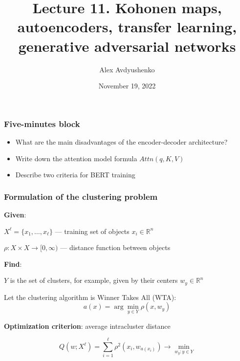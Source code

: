 \documentclass[fullscreen=true, bookmarks=true, hyperref={pdfencoding=unicode}]{beamer}
\title{Lecture 11. Kohonen maps, autoencoders, transfer learning, generative adversarial networks}
\author{Alex Avdyushenko}
\institute{Kazakh-British Technical University}
\date{November 19, 2022}
\begin{document}

\begin{frame}
\transdissolve[duration=0.2]
\titlepage
\end{frame}


\begin{frame}
  \frametitle{Five-minutes block}
  \pause
  \begin{itemize}
    \item What are the main disadvantages of the encoder-decoder architecture?
    \item Write down the attention model formula $Attn(q, K, V)$
    \item Describe two criteria for BERT training
  \end{itemize}
\end{frame}


\begin{frame}
  \frametitle{Formulation of the clustering problem}

   {\bf Given}:

    $X^\ell = \{x_1, \dots, x_\ell \}$ — training set of objects $x_i \in \mathbb{R}^n$

    $\rho: X \times X \to [0, \infty)$ — distance function between objects

   \pause
   {\bf Find}:

   $Y$ is the set of clusters, for example, given by their centers $w_y \in \mathbb{R}^n$

   Let the clustering algorithm is Winner Takes All (WTA):
   $$a(x) = \arg\min\limits_{y \in Y} \rho(x, w_y)$$

   \pause
   {\bf Optimization criterion}: average intracluster distance

   $$ Q(w; X^\ell) = \sum\limits_{i=1}^\ell \rho^2(x_i, w_{a(x_i)}) \to \min\limits_{w_y: y \in Y}$$
\end{frame}

\end{document}
